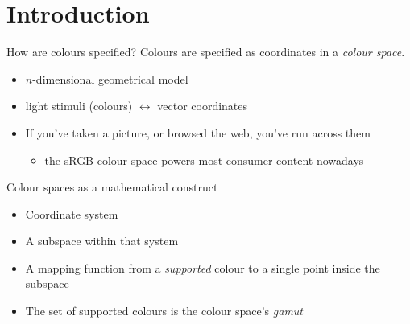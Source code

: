 \documentclass[aspectratio=169,handout,usepdftitle=false]{fireshonks}
\begin{document}
\section{Introduction}
\begin{frame}{How are colours specified?}
    Colours are specified as coordinates in a \emph{colour space}.
    \begin{itemize}[<+(1)->]
        \item $n$-dimensional geometrical model
        \item light stimuli (colours) $\leftrightarrow$ vector coordinates
        \item If you've taken a picture, or browsed the web, you've run across them
              \begin{itemize}
                  \item the sRGB colour space powers most consumer content nowadays
              \end{itemize}
    \end{itemize}
\end{frame}
\begin{frame}{Colour spaces as a mathematical construct}
    \begin{itemize}
        \item Coordinate system
        \item A subspace within that system
        \item A mapping function from a \emph{supported} colour to a single point inside the subspace
        \item The set of supported colours is the colour space's \emph{gamut}
    \end{itemize}
\end{frame}
\end{document}
